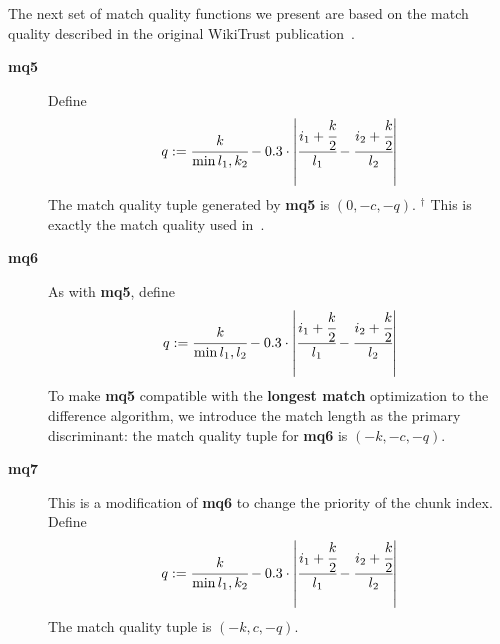 The next set of match quality functions we present are
based on the match quality described in the
original WikiTrust publication~\cite{Adler2007}.
%
\begin{description}

\item[\textbf{mq5}]
    Define
    \begin{equation*}
    q := \cfrac{k}{\min{l_1, k_2}} - 0.3 \cdot
        \left|\cfrac{ i_1 + \cfrac{k}{2} }{l_1}
            - \cfrac{ i_2 + \cfrac{k}{2} }{l_2} \right|
    \end{equation*}
    The match quality tuple generated by \textbf{mq5} is $(0, -c, -q)$.
    ${}^\dagger$
    This is exactly the match quality used in~\cite{Adler2007}.

\item[\textbf{mq6}]
    As with \textbf{mq5}, define
    \begin{equation*}
    q := \cfrac{k}{\min{l_1, l_2}} - 0.3 \cdot
        \left|\cfrac{ i_1 + \cfrac{k}{2} }{l_1}
            - \cfrac{ i_2 + \cfrac{k}{2} }{l_2} \right|
    \end{equation*}
    To make \textbf{mq5} compatible with the \textbf{longest match}
    optimization to the difference algorithm, we introduce the
    match length as the primary discriminant:
    the match quality tuple for \textbf{mq6} is $(-k, -c, -q)$.

\item[\textbf{mq7}] This is a modification of \textbf{mq6}
    to change the priority of the chunk index.
    Define
    \begin{equation*}
    q := \cfrac{k}{\min{l_1, k_2}} - 0.3 \cdot
        \left|\cfrac{ i_1 + \cfrac{k}{2} }{l_1}
            - \cfrac{ i_2 + \cfrac{k}{2} }{l_2} \right|
    \end{equation*}
    The match quality tuple is $(-k, c, -q)$.

\end{description}

